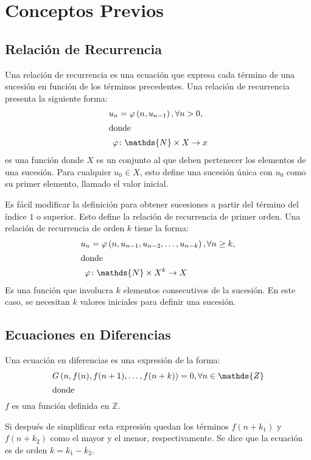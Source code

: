 \section{Conceptos Previos}

\subsection{Relación de Recurrencia}

Una relación de recurrencia es una ecuación que expresa cada término de una sucesión en función de los términos precedentes. Una relación de recurrencia presenta la siguiente forma:
\begin{align*}
	u_{n}&=\varphi\left(n,u_{n-1}\right),\forall n>0,\\
	\intertext{donde}
	\varphi&\colon\mathds{N}\times X\rightarrow x
\end{align*}
es una función donde $X$ es un conjunto al que deben pertenecer los elementos de una sucesión. Para cualquier $u_{0}\in X$, esto define una sucesión única con $u_{0}$ como su primer elemento, llamado el valor inicial.

Es fácil modificar la definición para obtener sucesiones a partir del término del índice $1$ o superior. Esto define la relación de recurrencia de primer orden. Una relación de recurrencia de orden $k$ tiene la forma:
\begin{align*}
	u_{n}&=\varphi\left(n,u_{n-1},u_{n-2},\ldots,u_{n-k}\right),\forall n\geq k,\\
	\intertext{donde}
	\varphi&\colon\mathds{N}\times X^{k}\rightarrow X
\end{align*}
Es una función que involucra $k$ elementos consecutivos de la sucesión. En este caso, se necesitan $k$ valores iniciales para definir una sucesión.

\subsection{Ecuaciones en Diferencias}

Una ecuación en diferencias es una expresión de la forma:
\begin{align*}
	G\left(n,f(n),f(n+1),\ldots,f(n+k)\right)&=0,\forall n\in\mathds{Z}\\
	\intertext{donde}
\end{align*}
$f$ es una función definida en $\mathds{Z}$.

Si después de simplificar esta expresión quedan los términos $f\left(n+k_{1}\right)$ y $f\left(n+k_{2}\right)$ como el mayor y el menor, respectivamente. Se dice que la ecuación es de orden $k=k_{1}-k_{2}$.

